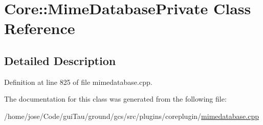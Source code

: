 \hypertarget{class_core_1_1_mime_database_private}{\section{Core\-:\-:Mime\-Database\-Private Class Reference}
\label{class_core_1_1_mime_database_private}
}


\subsection{Detailed Description}


Definition at line 825 of file mimedatabase.\-cpp.



The documentation for this class was generated from the following file\-:\begin{DoxyCompactItemize}
\item 
/home/jose/\-Code/gui\-Tau/ground/gcs/src/plugins/coreplugin/\hyperlink{mimedatabase_8cpp}{mimedatabase.\-cpp}\end{DoxyCompactItemize}

